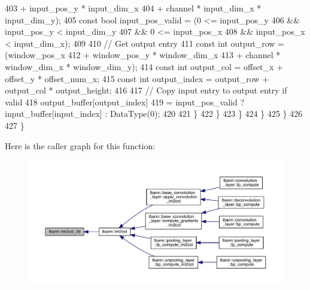 \begin{DoxyCode}
403                                      + input\_pos\_y * input\_dim\_x
404                                      + channel * input\_dim\_x * input\_dim\_y);
405             \textcolor{keyword}{const} \textcolor{keywordtype}{bool} input\_pos\_valid = (0 <= input\_pos\_y
406                                           && input\_pos\_y < input\_dim\_y
407                                           && 0 <= input\_pos\_x
408                                           && input\_pos\_x < input\_dim\_x);
409 
410             \textcolor{comment}{// Get output entry}
411             \textcolor{keyword}{const} \textcolor{keywordtype}{int} output\_row = (window\_pos\_x
412                                     + window\_pos\_y * window\_dim\_x
413                                     + channel * window\_dim\_x * window\_dim\_y);
414             \textcolor{keyword}{const} \textcolor{keywordtype}{int} output\_col = offset\_x + offset\_y * offset\_num\_x;
415             \textcolor{keyword}{const} \textcolor{keywordtype}{int} output\_index = output\_row + output\_col * output\_height;
416 
417             \textcolor{comment}{// Copy input entry to output entry if valid}
418             output\_buffer[output\_index]
419               = input\_pos\_valid ? input\_buffer[input\_index] : DataType(0);
420 
421           \}
422         \}
423       \}
424     \}
425   \}
426 
427 \}
\end{DoxyCode}
Here is the caller graph for this function\+:\nopagebreak
\begin{figure}[H]
\begin{center}
\leavevmode
\includegraphics[width=350pt]{namespacelbann_adc05d10657be77ccd9a74b1621c416c3_icgraph}
\end{center}
\end{figure}
\mbox{\label{namespacelbann_a8987701a637ff0e678114aa77e9c4d40}} 
